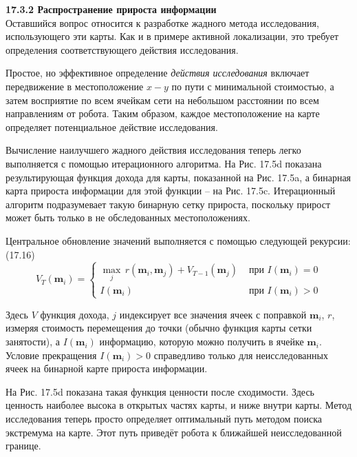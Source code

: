 \documentclass[10pt,a4paper]{article}
\begin{document}
\textbf{17.3.2	Распространение прироста информации}\\

Оставшийся вопрос относится к разработке жадного метода исследования, использующего эти карты. Как и в примере активной локализации, это требует определения соответствующего действия исследования.

Простое, но эффективное определение \textit{действия исследования} включает передвижение в местоположение $x-y$ по пути с минимальной стоимостью, а затем восприятие по всем ячейкам сети на небольшом расстоянии по всем направлениям от робота. Таким образом, каждое местоположение на карте определяет потенциальное действие исследования.

Вычисление наилучшего жадного действия исследования теперь легко выполняется с помощью итерационного алгоритма. На Рис. 17.5d показана результирующая функция дохода для карты, показанной на Рис. 17.5a, а бинарная карта прироста информации для этой функции – на Рис. 17.5c. Итерационный алгоритм подразумевает такую бинарную сетку прироста, поскольку прирост может быть только в не обследованных местоположениях.

Центральное обновление значений выполняется с помощью следующей рекурсии:\\

(17.16)
\begin{equation*}
V_T(\textbf{m}_i) = \left\{
\begin{array}{cl}
\max_j\,r(\textbf{m}_i,\textbf{m}_j)+V_{T-1}(\textbf{m}_j)& \mbox{ при } I(\textbf{m}_i)=0 \\
I(\textbf{m}_i)& \mbox{ при } I(\textbf{m}_i) > 0
\end{array}
\right.
\end{equation*}

Здесь $V$ функция дохода, $j$ индексирует все значения ячеек с поправкой $\textbf{m}_i$, $r$, измеряя стоимость перемещения до точки (обычно функция карты сетки занятости), а $I(\textbf{m}_i)$ информацию, которую можно получить в ячейке $\textbf{m}_i$. Условие прекращения $I(\textbf{m}_i) > 0$ справедливо только для неисследованных ячеек на бинарной карте прироста информации.

На Рис. 17.5d показана такая функция ценности после сходимости. Здесь ценность наиболее высока в открытых частях карты, и ниже внутри карты. Метод исследования теперь просто определяет оптимальный путь методом поиска экстремума на карте. Этот путь приведёт робота к ближайшей неисследованной границе.
\end{document}
